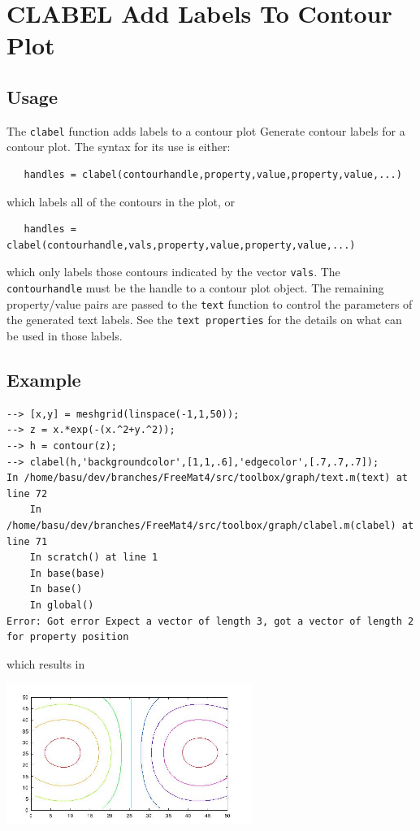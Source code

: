 \section{CLABEL Add Labels To Contour Plot}

\subsection{Usage}

The \verb|clabel| function adds labels to a contour plot
Generate contour labels for a contour plot.  The syntax
for its use is either:
\begin{verbatim}
   handles = clabel(contourhandle,property,value,property,value,...)
\end{verbatim}
which labels all of the contours in the plot, or
\begin{verbatim}
   handles = clabel(contourhandle,vals,property,value,property,value,...)
\end{verbatim}
which only labels those contours indicated by the vector \verb|vals|.
The \verb|contourhandle| must be the handle to a contour plot object.
The remaining property/value pairs are passed to the \verb|text| function
to control the parameters of the generated text labels.  See the 
\verb|text properties| for the details on what can be used in those labels.
\subsection{Example}

\begin{verbatim}
--> [x,y] = meshgrid(linspace(-1,1,50));
--> z = x.*exp(-(x.^2+y.^2));
--> h = contour(z);
--> clabel(h,'backgroundcolor',[1,1,.6],'edgecolor',[.7,.7,.7]);
In /home/basu/dev/branches/FreeMat4/src/toolbox/graph/text.m(text) at line 72
    In /home/basu/dev/branches/FreeMat4/src/toolbox/graph/clabel.m(clabel) at line 71
    In scratch() at line 1
    In base(base)
    In base()
    In global()
Error: Got error Expect a vector of length 3, got a vector of length 2 for property position
\end{verbatim}
which results in


\centerline{\includegraphics[width=8cm]{clabel1}}

